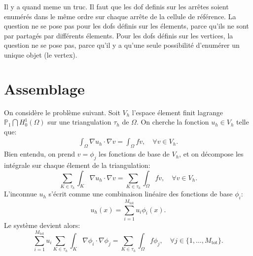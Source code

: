 Il y a quand meme un truc. Il faut que les dof definis sur les
arr\^etes soient enum\'er\'es dans le m\^eme ordre sur chaque arr\^ete de
la cellule de r\'ef\'erence. La question ne se pose pas pour les dofs
d\'efinis sur les \'elements, parce qu'ils ne sont par partag\'es par
diff\'erents \'elements. Pour les dofs d\'efinis sur les vertices, la
question ne se pose pas, parce qu'il y a qu'une seule possibilit\'e
d'enum\'erer un unique objet (le vertex). 

\section{Assemblage}
On consid\`ere le probl\`eme suivant. Soit $V_h$ l'espace \'element finit lagrange $\mathbb P_1\bigcap H^1_0(\Omega)$ sur une triangulation $\tau_h$ de $\Omega$. On cherche la fonction $u_h\in V_h$ telle que:
\begin{align}
  \int_\Omega \nabla u_h\cdot \nabla v = \int_\Omega f v,\quad \forall v \in V_h.
\end{align}
Bien entendu, on prend $v = \phi_j$ les fonctions de base de $V_h$, et on d\'ecompose les int\'egrale sur chaque \'element de la triangulation:
\begin{equation}
  \sum_{K\in\tau_h}\int_K \nabla u_h\cdot \nabla v = \sum_{K \in \tau_h}\int_\Omega f v, \quad \forall v \in V_h.
\end{equation}
L'inconnue $u_h$ s'\'ecrit comme une combinaison lin\'eaire des fonctions de base $\phi_i$:
\begin{equation}
  u_h(x) = \sum_{i = 1}^{M_\text{tot}} u_i \phi_i(x).
\end{equation}
Le syst\`eme devient alors:
\begin{equation}
  \sum_{i = 1}^{M_\text{tot}}u_i\sum_{K\in\tau_h}\int_K \nabla \phi_i\cdot \nabla \phi_j = \sum_{K \in \tau_h}\int_\Omega f \phi_j, \quad \forall j \in \{1, \dots,M_\text{tot}\}.
\end{equation}

